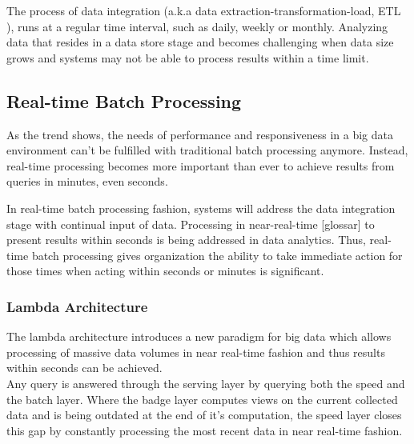 The process of  data integration (a.k.a data extraction-transformation-load, ETL
), runs at a regular time interval, such as daily, weekly or
monthly. Analyzing data that resides in a data store stage and becomes
challenging when data size grows and systems may not be able to process results
within a time limit. \cite{Liu:2014:SRP:2628194.2628251}

\subsection{Real-time Batch Processing}
As the trend shows, the needs of performance and responsiveness in a big data
environment can't be fulfilled with traditional batch processing anymore.
Instead, real-time processing becomes more important than ever to achieve
results from queries in minutes, even seconds. 
\cite{bange2013big}

In real-time batch processing fashion, systems will address the data integration stage
with continual input of data. Processing in near-real-time [glossar] to present 
results within seconds is being addressed in data analytics. Thus,
real-time batch processing gives organization the ability to take immediate action
for those times when acting within seconds or minutes is significant.
\cite{PrpSvyOfDSPS}

\subsubsection{Lambda Architecture}
The lambda architecture introduces a new paradigm for big data which allows
processing of massive data volumes in near real-time fashion and thus results within
seconds can be achieved. 
\\
Any query is answered through the serving layer by querying 
both the speed and the batch layer. Where the badge layer computes views on the current collected data and
is being outdated at the end of it's computation, the speed layer closes this 
gap by constantly processing the most recent data in near real-time fashion. 

\cite{marz2015big} \cite{PrpSvyOfDSPS}


